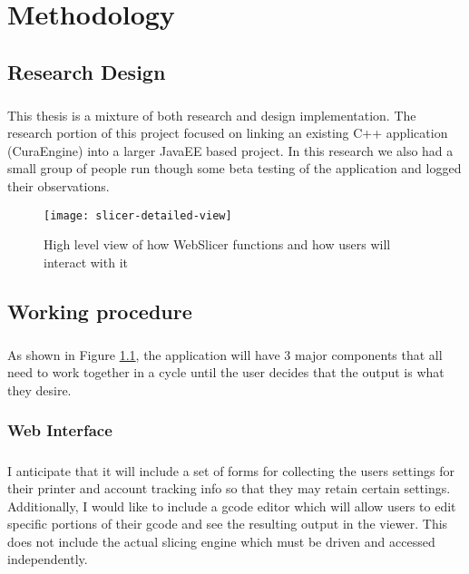 \chapter{Methodology}

\section{Research Design} 
\paragraph{}
This thesis is a mixture of both research and design implementation.
The research portion of this project focused on linking an existing C++ application (CuraEngine) into a larger JavaEE based project.
In this research we also had a small group of people run though some beta testing of the application and logged their observations.

\begin{figure}[!ht]
  \centering
  \texttt{[image: slicer-detailed-view]}
  \caption{High level view of how WebSlicer functions and how users will interact with it}
  \label{fig:slicer-detailed-view}
\end{figure}

\section{Working procedure}
\paragraph{}
As shown in Figure \ref{fig:slicer-detailed-view}, the application will have 3 major components that all need to work together in a cycle until the user decides that the output is what they desire.

\subsection{Web Interface}
\paragraph{}
I anticipate that it will include a set of forms for collecting the users settings for their printer and account tracking info so that they may retain certain settings. 
Additionally, I would like to include a gcode editor which will allow users to edit specific portions of their gcode and see the resulting output in the viewer. 
This does not include the actual slicing engine which must be driven and accessed independently.

